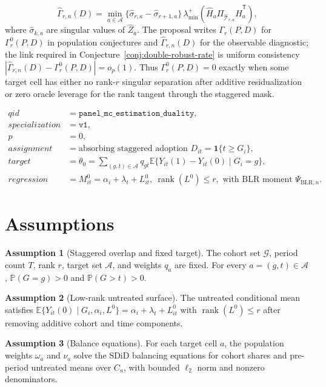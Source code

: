 \documentclass[11pt]{article}
\newcommand{\E}{\mathbb{E}}
\renewcommand{\Pr}{\mathbb{P}}
\newcommand{\one}{\mathbf{1}}
\newcommand{\transpose}{\mathsf{T}}
\theoremstyle{definition}
\newtheorem{assumption}{Assumption}
\theoremstyle{plain}
\theoremstyle{remark}
\begin{document}
\[
  \widehat\Gamma_{r,n}(D)=\min_{a\in\mathcal A}
  \{\widehat\sigma_{r,a}-\widehat\sigma_{r+1,a}\}\,
  \lambda_{\min}^{+}\!\left(
  \widehat H_a\Pi_{\widehat{\mathcal T}_{r,a}}\widehat H_a^{\transpose}\right),
\]
where $\widehat\sigma_{k,a}$ are singular values of $\widehat Z_a$. The
proposal writes $\Gamma_r(P,D)$ for $\Gamma^0_r(P,D)$ in population
conjectures and $\widehat\Gamma_{r,n}(D)$ for the observable diagnostic; the
link required in Conjecture~\ref{conj:double-robust-rate} is uniform
consistency
$|\widehat\Gamma_{r,n}(D)-\Gamma^0_r(P,D)|=o_p(1)$. Thus
$\Gamma^0_r(P,D)=0$ exactly when some target cell has either no rank-$r$
singular separation after additive residualization or zero oracle leverage for
the rank tangent through the staggered mask.

\[
\begin{array}{ll}
qid & =\texttt{panel\_mc\_estimation\_duality},\\
specialization & =\texttt{v1},\\
p & =0,\\
assignment & =\text{absorbing staggered adoption }D_{it}=\one\{t\ge G_i\},\\
target & =\theta_0=\sum_{(g,t)\in\mathcal A}q_{gt}\E\{Y_{it}(1)-Y_{it}(0)\mid G_i=g\},\\
regression & =M^0_{it}=\alpha_i+\lambda_t+L^0_{it},\ \operatorname{rank}(L^0)\le r,
\text{ with BLR moment }\Psi_{\mathrm{BLR},n}.
\end{array}
\]

\section{Assumptions}
\begin{assumption}[Staggered overlap and fixed target]\label{ass:staggered-overlap}
The cohort set $\mathcal G$, period count $T$, rank $r$, target set
$\mathcal A$, and weights $q_a$ are fixed. For every $a=(g,t)\in\mathcal A$,
$\Pr(G=g)>0$ and $\Pr(G>t)>0$.
\end{assumption}

\begin{assumption}[Low-rank untreated surface]\label{ass:low-rank}
The untreated conditional mean satisfies
$\E\{Y_{it}(0)\mid G_i,\alpha_i,L^0\}=\alpha_i+\lambda_t+L^0_{it}$ with
$\operatorname{rank}(L^0)\le r$ after removing additive cohort and time
components.
\end{assumption}

\begin{assumption}[Balance equations]\label{ass:balance}
For each target cell $a$, the population weights $\omega_a$ and $\nu_a$ solve
the SDiD balancing equations for cohort shares and pre-period untreated means
over $C_a$, with bounded $\ell_2$ norm and nonzero denominators.
\end{assumption}
\end{document}
